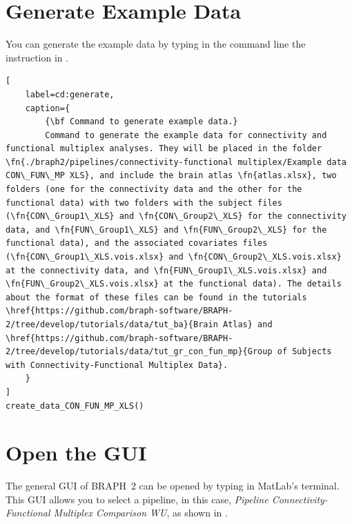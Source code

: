 \documentclass[justified]{tufte-handout}
\begin{document}

\tableofcontents

\clearpage
\section{Generate Example Data}

You can generate the example data by typing in the command line the instruction in .

\begin{lstlisting}[
	label=cd:generate,
	caption={
		{\bf Command to generate example data.}
		Command to generate the example data for connectivity and functional multiplex analyses. They will be placed in the folder \fn{./braph2/pipelines/connectivity-functional multiplex/Example data CON\_FUN\_MP XLS}, and include the brain atlas \fn{atlas.xlsx}, two folders (one for the connectivity data and the other for the functional data) with two folders with the subject files (\fn{CON\_Group1\_XLS} and \fn{CON\_Group2\_XLS} for the connectivity data, and \fn{FUN\_Group1\_XLS} and \fn{FUN\_Group2\_XLS} for the functional data), and the associated covariates files (\fn{CON\_Group1\_XLS.vois.xlsx} and \fn{CON\_Group2\_XLS.vois.xlsx} at the connectivity data, and \fn{FUN\_Group1\_XLS.vois.xlsx} and \fn{FUN\_Group2\_XLS.vois.xlsx} at the functional data). The details about the format of these files can be found in the tutorials \href{https://github.com/braph-software/BRAPH-2/tree/develop/tutorials/data/tut_ba}{Brain Atlas} and \href{https://github.com/braph-software/BRAPH-2/tree/develop/tutorials/data/tut_gr_con_fun_mp}{Group of Subjects with Connectivity-Functional Multiplex Data}.
	}
]
create_data_CON_FUN_MP_XLS()
\end{lstlisting}

\section{Open the GUI}

The general GUI of BRAPH~2 can be opened by typing  in MatLab's terminal. This GUI allows you to select a pipeline, in this case, \emph{Pipeline Connectivity-Functional Multiplex Comparison WU}, as shown in .
\end{document}
